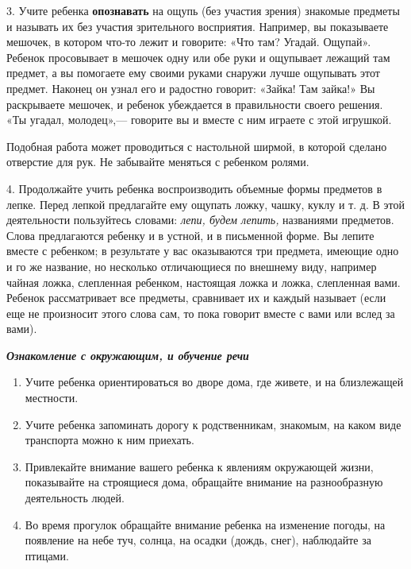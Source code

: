 \documentclass{book}
\renewcommand{\emph}[1]{\textit{#1}}
\begin{document}
3. Учите ребенка \textbf{опознавать} на ощупь (без участия зрения)
знакомые предметы и называть их без участия зрительного восприятия.
Например, вы показываете мешочек, в котором что-то лежит и говорите:
«Что там? Угадай. Ощупай». Ребенок просовывает в мешочек одну или обе
руки и ощупывает лежащий там предмет, а вы помогаете ему своими руками
снаружи лучше ощупывать этот предмет. Наконец он узнал его и радостно
говорит: «Зайка! Там зайка!» Вы раскрываете мешочек, и ребенок
убеждается в правильности своего решения. «Ты угадал, молодец»,---
говорите вы и вместе с ним играете с этой игрушкой.

Подобная работа может проводиться с настольной ширмой, в которой сделано
отверстие для рук. Не забывайте меняться с ребенком ролями.

4. Продолжайте учить ребенка воспроизводить объемные формы предметов в
лепке. Перед лепкой предлагайте ему ощупать ложку, чашку, куклу и т. д.
В этой деятельности пользуйтесь словами: \emph{лепи, будем лепить,}
названиями предметов. Слова предлагаются ребенку и в устной, и в
письменной форме. Вы лепите вместе с ребенком; в результате у вас
оказываются три предмета, имеющие одно и го же название, но несколько
отличающиеся по внешнему виду, например чайная ложка, слепленная
ребенком, настоящая ложка и ложка, слепленная вами. Ребенок
рассматривает все предметы, сравнивает их и каждый называет (если еще не
произносит этого слова сам, то пока говорит вместе с вами или вслед за
вами).

\emph{\textbf{Ознакомление с окружающим, и обучение речи}}


\begin{enumerate}
\def\labelenumi{\arabic{enumi}.}
\item
  
  Учите ребенка ориентироваться во дворе дома, где живете, и на
  близлежащей местности.
  
\item
  
  Учите ребенка запоминать дорогу к родственникам, знакомым, на каком
  виде транспорта можно к ним приехать.
  
\item
  
  Привлекайте внимание вашего ребенка к явлениям окружающей жизни,
  показывайте на строящиеся дома, обращайте внимание на разнообразную
  деятельность людей.
  
\item
  
  Во время прогулок обращайте внимание ребенка на изменение погоды, на
  появление на небе туч, солнца, на осадки (дождь, снег), наблюдайте за
  птицами.
  
\end{enumerate}
\end{document}

